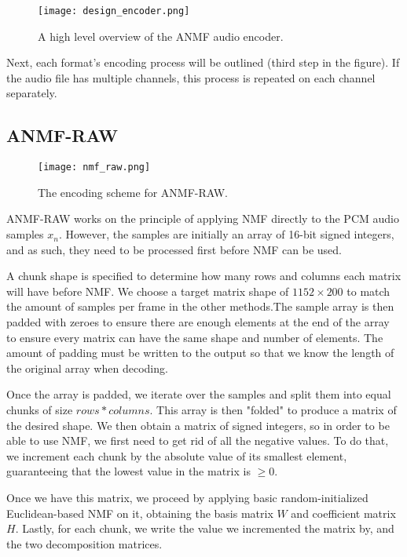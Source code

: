 \begin{figure}[ht]
	\caption[Encoder overview]{A high level overview of the ANMF audio encoder.}
	\label{fig:design_encoder}
	\centering
	\texttt{[image: design\_encoder.png]}
\end{figure}

Next, each format's encoding process will be outlined (third step in the figure). If the audio file has multiple channels, this process is repeated on each channel separately.

\subsection{ANMF-RAW}
\begin{figure}[ht]
	\caption[ANMF-RAW Encoder]{The encoding scheme for ANMF-RAW.}
	\label{fig:encoding_nmf_raw}
	\centering
	\texttt{[image: nmf\_raw.png]}
\end{figure}

ANMF-RAW works on the principle of applying NMF directly to the PCM audio samples $x_n$. However, the samples are initially an array of 16-bit signed integers, and as such, they need to be processed first before NMF can be used.

A chunk shape is specified to determine how many rows and columns each matrix will have before NMF. We choose a target matrix shape of $1152 \times 200$ to match the amount of samples per frame in the other methods.The sample array is then padded with zeroes to ensure there are enough elements at the end of the array to ensure every matrix can have the same shape and number of elements. The amount of padding must be written to the output so that we know the length of the original array when decoding.

Once the array is padded, we iterate over the samples and split them into equal chunks of size $rows*columns$. This array is then "folded" to produce a matrix of the desired shape. We then obtain a matrix of signed integers, so in order to be able to use NMF, we first need to get rid of all the negative values. To do that, we increment each chunk by the absolute value of its smallest element, guaranteeing that the lowest value in the matrix is $\ge 0$.

Once we have this matrix, we proceed by applying basic random-initialized Euclidean-based NMF on it, obtaining the basis matrix $W$ and coefficient matrix $H$. Lastly, for each chunk, we write the value we incremented the matrix by, and the two decomposition matrices.


